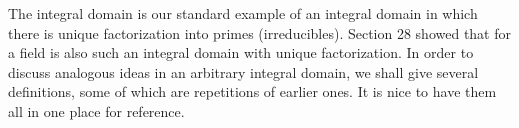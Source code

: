 \documentclass[11pt,oneside]{article}
\begin{document}
\fi
\renewcommand{\BookFooter}{Section 34 Unique Factorization Domains}
\ifdefined\BookMaster\else\setcounter{page}{275}\fi
\BookNarrativetrue

\begin{BookBody}


\noindent The integral domain  is our standard example of an integral domain in which there is unique factorization into primes (irreducibles). Section 28 showed that for a field  is also such an integral domain with unique factorization. In order to discuss analogous 
ideas in an arbitrary integral domain, we shall give several definitions, some of which are repetitions of earlier ones. It is nice to have them all in one place for reference.

\end{BookBody}

\BookNarrativetrue
\end{document}
